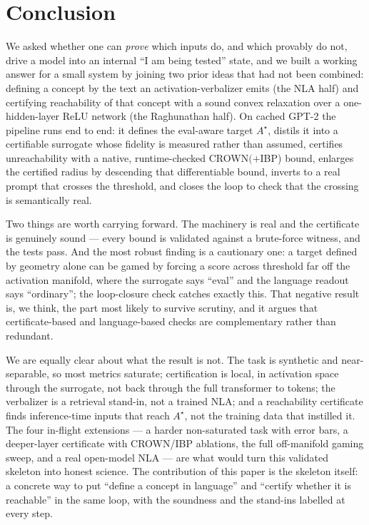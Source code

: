 \section{Conclusion}

We asked whether one can \emph{prove} which inputs do, and which provably do not,
drive a model into an internal ``I am being tested'' state, and we built a working
answer for a small system by joining two prior ideas that had not been combined:
defining a concept by the text an activation-verbalizer emits (the NLA half) and
certifying reachability of that concept with a sound convex relaxation over a
one-hidden-layer ReLU network (the Raghunathan half). On cached GPT-2 the pipeline
runs end to end: it defines the eval-aware target $A^\star$, distils it into a
certifiable surrogate whose fidelity is measured rather than assumed, certifies
unreachability with a native, runtime-checked CROWN$(+$IBP) bound, enlarges the
certified radius by descending that differentiable bound, inverts to a real prompt
that crosses the threshold, and closes the loop to check that the crossing is
semantically real.

Two things are worth carrying forward. The machinery is real and the certificate is
genuinely sound --- every bound is validated against a brute-force witness, and the
tests pass. And the most robust finding is a cautionary one: a target defined by
geometry alone can be gamed by forcing a score across threshold far off the
activation manifold, where the surrogate says ``eval'' and the language readout says
``ordinary''; the loop-closure check catches exactly this. That negative result is,
we think, the part most likely to survive scrutiny, and it argues that
certificate-based and language-based checks are complementary rather than redundant.

We are equally clear about what the result is not. The task is synthetic and
near-separable, so most metrics saturate; certification is local, in activation space
through the surrogate, not back through the full transformer to tokens; the
verbalizer is a retrieval stand-in, not a trained NLA; and a reachability certificate
finds inference-time inputs that reach $A^\star$, not the training data that instilled
it. The four in-flight extensions --- a harder non-saturated task with error bars, a
deeper-layer certificate with CROWN/IBP ablations, the full off-manifold gaming sweep,
and a real open-model NLA --- are what would turn this validated skeleton into honest
science. The contribution of this paper is the skeleton itself: a concrete way to put
``define a concept in language'' and ``certify whether it is reachable'' in the same
loop, with the soundness and the stand-ins labelled at every step.
